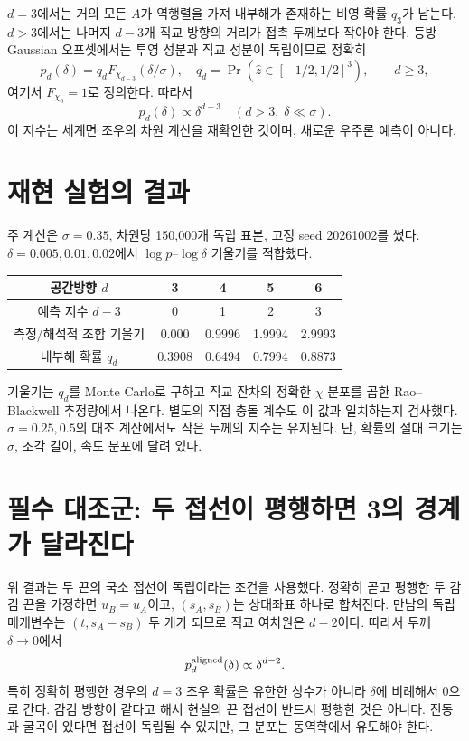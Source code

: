 \documentclass[11pt,a4paper]{article}
\begin{document}
$d=3$에서는 거의 모든 $A$가 역행렬을 가져 내부해가 존재하는
비영 확률 $q_3$가 남는다. $d>3$에서는 나머지 $d-3$개
직교 방향의 거리가 접촉 두께보다 작아야 한다. 등방 Gaussian
오프셋에서는 투영 성분과 직교 성분이 독립이므로 정확히
\begin{equation}
p_d(\delta)=q_d F_{\chi_{d-3}}(\delta/\sigma),\quad
q_d=\Pr(\hat z\in[-1/2,1/2]^3),\qquad d\ge3,
\end{equation}
여기서 $F_{\chi_0}=1$로 정의한다. 따라서
\begin{equation}
p_d(\delta)\propto\delta^{d-3}\quad(d>3,\;\delta\ll\sigma).
\end{equation}
이 지수는 세계면 조우의 차원 계산을 재확인한 것이며,
새로운 우주론 예측이 아니다.

\section{재현 실험의 결과}
주 계산은 $\sigma=0.35$, 차원당 150,000개 독립 표본,
고정 seed 20261002를 썼다. $\delta=0.005,0.01,0.02$에서
$\log p$--$\log\delta$ 기울기를 적합했다.
\begin{center}
\begin{tabular}{@{}ccccc@{}}
\toprule
공간방향 $d$ & 3 & 4 & 5 & 6\\
\midrule
예측 지수 $d-3$ & 0 & 1 & 2 & 3\\
측정/해석적 조합 기울기 & 0.000 & 0.9996 & 1.9994 & 2.9993\\
내부해 확률 $q_d$ & 0.3908 & 0.6494 & 0.7994 & 0.8873\\
\bottomrule
\end{tabular}
\end{center}
기울기는 $q_d$를 Monte Carlo로 구하고 직교 잔차의 정확한
$\chi$ 분포를 곱한 Rao--Blackwell 추정량에서 나온다.
별도의 직접 충돌 계수도 이 값과 일치하는지 검사했다.
$\sigma=0.25,0.5$의 대조 계산에서도 작은 두께의 지수는 유지된다.
단, 확률의 절대 크기는 $\sigma$, 조각 길이, 속도 분포에 달려 있다.

\section{필수 대조군: 두 접선이 평행하면 3의 경계가 달라진다}
위 결과는 두 끈의 국소 접선이 독립이라는 조건을 사용했다.
정확히 곧고 평행한 두 감김 끈을 가정하면 $u_B=u_A$이고,
$(s_A,s_B)$는 상대좌표 하나로 합쳐진다. 만남의 독립 매개변수는
$(t,s_A-s_B)$ 두 개가 되므로 직교 여차원은 $d-2$이다.
따라서 두께 $\delta\to0$에서
\begin{equation}
p_d^{\rm aligned}(\delta)\propto\delta^{d-2}.
\end{equation}
특히 정확히 평행한 경우의 $d=3$ 조우 확률은 유한한 상수가
아니라 $\delta$에 비례해서 0으로 간다. 감김 방향이 같다고 해서
현실의 끈 접선이 반드시 평행한 것은 아니다. 진동과 굴곡이
있다면 접선이 독립될 수 있지만, 그 분포는 동역학에서 유도해야 한다.
\end{document}
